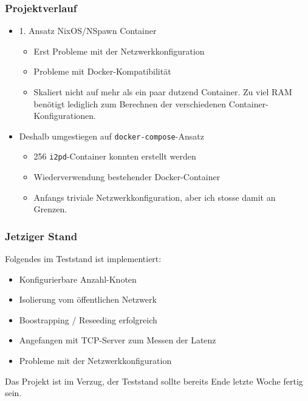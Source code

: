 \documentclass{beamer}
\begin{document}
    \begin{frame}
        \frametitle{Projektverlauf}

        \begin{itemize}
            \item 1. Ansatz NixOS/NSpawn Container
                \begin{itemize}
                    \item Erst Probleme mit der Netzwerkkonfiguration
                    \item Probleme mit Docker-Kompatibilität
                    \item Skaliert nicht auf mehr als ein paar dutzend Container. Zu viel RAM benötigt lediglich zum Berechnen der verschiedenen Container-Konfigurationen.
                \end{itemize}
            \item Deshalb umgestiegen auf \lstinline|docker-compose|-Ansatz
                \begin{itemize}
                    \item 256 \lstinline|i2pd|-Container konnten erstellt werden
                    \item Wiederverwendung bestehender Docker-Container
                    \item Anfangs triviale Netzwerkkonfiguration, aber ich stosse damit an Grenzen.
                \end{itemize}
        \end{itemize}
    \end{frame}


    \begin{frame}
        \frametitle{Jetziger Stand}

        Folgendes im Teststand ist implementiert:

        \begin{itemize}
            \item Konfigurierbare Anzahl-Knoten
            \item Isolierung vom öffentlichen Netzwerk
            \item Boostrapping / Reseeding erfolgreich
            \item Angefangen mit TCP-Server zum Messen der Latenz
            \item Probleme mit der Netzwerkkonfiguration
        \end{itemize}

        Das Projekt ist im Verzug, der Teststand sollte bereits Ende letzte Woche fertig sein.
    \end{frame}
\end{document}
